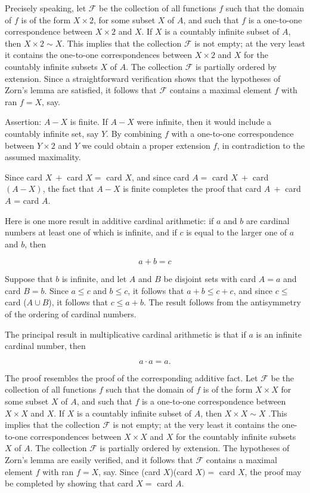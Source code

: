 Precisely speaking, let $\mathcal{F}$ be the collection of all functions $f$ such that the domain of $f$ is of the form $X \times 2$, for some subset $X$ of $A$, and such that $f$ is a one-to-one correspondence between $X \times 2$ and $X$. If $X$ is a countably infinite subset of $A$, then $X \times 2 \sim X$. This implies that the collection $\mathcal{F}$ is not empty; at the very least it contains the one-to-one correspondences between $X \times 2$ and $X$ for the countably infinite subsets $X$ of $A$. The collection $\mathcal{F}$ is partially ordered by extension. Since a straightforward verification shows that the hypotheses of Zorn's lemma are satisfied, it follows that $\mathcal{F}$ contains a maximal element $f$ with ran $f = X$, say. 

Assertion: $A - X$ is finite. If $A - X$ were infinite, then it would include a countably infinite set, say $Y$. By combining $f$ with a one-to-one correspondence between $Y \times 2$ and $Y$ we could obtain a proper extension $f$, in contradiction to the assumed maximality. 

Since card $X\ +$ card $X =$ card $X$, and since card $A = $ card $X\ +$ card $(A - X)$, the fact that $A - X$ is finite completes the proof that card $A\ +$ card $A$ = card $A$.

Here is one more result in additive cardinal arithmetic: if $a$ and $b$ are cardinal numbers at least one of which is infinite, and if $c$ is equal to the larger one of $a$ and $b$, then 

\begin{equation*}
a + b = c
\end{equation*}

Suppose that $b$ is infinite, and let $A$ and $B$ be disjoint sets with card $A = a$ and card $B = b$. Since $a \le c$ and $b \le c$, it follows that $a + b \le c + c$, and since $c \le$ card ($A \cup B$), it follows that $c \le a + b$. The result follows from the antisymmetry of the ordering of cardinal numbers. 

The principal result in multiplicative cardinal arithmetic is that if $a$ is an infinite cardinal number, then 

\begin{equation*}
a \cdot a = a. 
\end{equation*}

The proof resembles the proof of the corresponding additive fact. Let $\mathcal{F}$ be the collection of all functions $f$ such that the domain of $f$ is of the form $X \times X$ for some subset $X$ of $A$, and such that $f$ is a one-to-one correspondence between $X \times X$ and $X$. If $X$ is a countably infinite subset of $A$, then $X \times X \sim X$ .This implies that the collection $\mathcal{F}$ is not empty; at the very least it contains the one-to-one correspondences between $X \times X$ and $X$ for the countably infinite subsets $X$ of $A$. The collection $\mathcal{F}$ is partially ordered by extension. The hypotheses of Zorn's lemma are easily verified, and it follows that $\mathcal{F}$ contains a maximal element $f$ with ran $f = X$, say. Since (card $X$)(card $X) =$ card $X$, the proof may be completed by showing that card $X =$ card $A$. 

